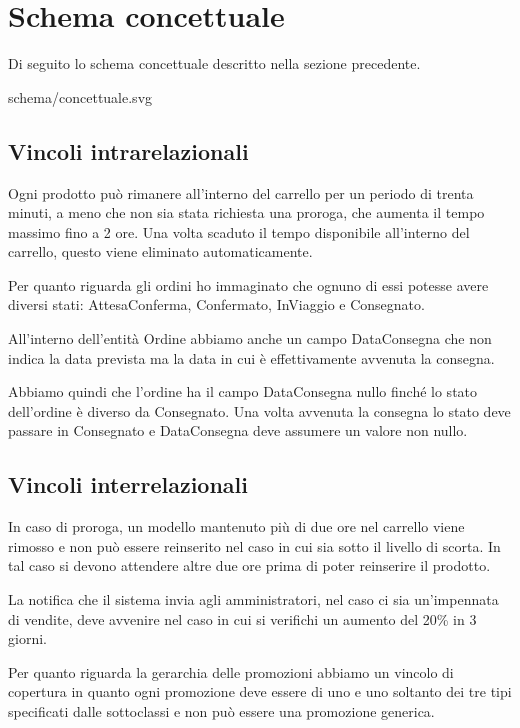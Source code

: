 \section{Schema concettuale}
Di seguito lo schema concettuale descritto nella sezione precedente.

\begin{center}
	 {schema/concettuale.svg}
\end{center}

\subsection{Vincoli intrarelazionali}
Ogni prodotto può rimanere all'interno del carrello per un periodo di trenta minuti, a meno che
non sia stata richiesta una proroga, che aumenta il tempo massimo fino a 2 ore. Una volta
scaduto il tempo disponibile all'interno del carrello, questo viene eliminato automaticamente.

Per quanto riguarda gli ordini ho immaginato che ognuno di essi potesse avere diversi stati:
AttesaConferma, Confermato, InViaggio e Consegnato.

All'interno dell'entità Ordine abbiamo anche un campo DataConsegna che non indica la data prevista
ma la data in cui è effettivamente avvenuta la consegna.

Abbiamo quindi che l'ordine ha il campo DataConsegna nullo finché lo stato dell'ordine è diverso
da Consegnato. Una volta avvenuta la consegna lo stato deve passare in Consegnato e DataConsegna
deve assumere un valore non nullo.

\subsection{Vincoli interrelazionali}
In caso di proroga, un modello mantenuto più di due ore nel carrello viene rimosso e non può
essere reinserito nel caso in cui sia sotto il livello di scorta. In tal caso si devono attendere
altre due ore prima di poter reinserire il prodotto.

La notifica che il sistema invia agli amministratori, nel caso ci sia un'impennata di vendite,
deve avvenire nel caso in cui si verifichi un aumento del 20\% in 3 giorni.

Per quanto riguarda la gerarchia delle promozioni abbiamo un vincolo di copertura in quanto ogni
promozione deve essere di uno e uno soltanto dei tre tipi specificati dalle sottoclassi e non può
essere una promozione generica.